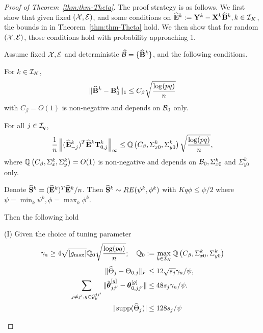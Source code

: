 \begin{proof}[Proof of Theorem~\ref{thm:thm-Theta}]
The proof strategy is as follows. We first show that given fixed $({\cal{X}},{\cal{E}})$, and some conditions on $\widehat {{\mathbf{E}}}^k := {\mathbf{Y}}^k - {\mathbf{X}}^k \widehat {{\mathbf{B}}}^k, k \in {\cal{I}}_K$, the bounds in in Theorem~\ref{thm:thm-Theta} hold. We then show that for random $({\cal{X}},{\cal{E}})$, those conditions hold with probability approaching 1.

\begin{Lemma}\label{thm:ThetaThm}
Assume fixed ${\cal{X}}, {\cal{E}}$ and deterministic $\widehat {{\cal{B}}} = \{ \widehat {{\mathbf{B}}}^k \}$, and the following conditions.

 For $k \in {\cal{I}}_K$,
%
$$
\| \widehat {{\mathbf{B}}}^k - {\mathbf{B}}^k_0 \|_1 \leq C_\beta \sqrt{\frac{\log (pq)}{n}}
$$
%
with $C_\beta = O(1)$ is non-negative and depends on ${\cal{B}}_0$ only.


 For all $j \in {\cal{I}}_q$,
%
$$
\frac{1}{n} \left\| (\widehat {{\mathbf{E}}}_{-j}^k)^T \widehat {{\mathbf{E}}}^k {\mathbf{T}}_{0,j}^k \right\|_\infty \leq
{\mathbb{Q}} \left(C_\beta, \Sigma_{x0}^k, \Sigma_{y0}^k \right) \sqrt {\frac{ \log (p q)}{n}},
$$
%
where ${\mathbb{Q}} \left(C_\beta, \Sigma_x^k, \Sigma_y^k \right) = O(1)$ is non-negative and depends on ${\cal{B}}_0, \Sigma_{x0}^k$ and $\Sigma_{y0}^k$ only.

 Denote $\widehat {{\mathbf{S}}}^k = (\widehat {{\mathbf{E}}}^k)^T \widehat {{\mathbf{E}}}^k/n$. Then $\widehat {{\mathbf{S}}}^k \sim RE(\psi^k, \phi^k)$ with $Kq \phi \leq \psi/2$ where $ \psi = \min_k \psi^k, \phi = \max_k \phi^k $.


Then the following hold

\noindent (I) Given the choice of tuning parameter
%
$$
\gamma_n \geq 4 \sqrt{| g_{\max}|} {\mathbb{Q}}_0 \sqrt {\frac{ \log (p q)}{n}}; \quad
{\mathbb{Q}}_0 := \max_{k \in {\cal{I}}_K} {\mathbb{Q}} \left(C_\beta, \Sigma_{x0}^k, \Sigma_{y0}^k  \right)
$$
%
\begin{align}
\| \widehat \Theta_j - \Theta_{0,j} \|_F & \leq 12 \sqrt{s_j} \gamma_n / \psi, \label{eqn:theta-norm-bound-1a}\\
\sum_{j \neq j', g \in {\cal{G}}_y^{jj'}} \| \hat {{\boldsymbol{\theta}}}_{jj'}^{[g]} - {\boldsymbol{\theta}}_{0,jj'}^{[g]} \| & \leq 48 s_j \gamma_n / \psi. \label{eqn:theta-norm-bound-2a}\\
| \operatorname*{supp} (\widehat \Theta_j) | & \leq 128 s_j / \psi
\end{align}
%


\end{Lemma}
\end{proof}
